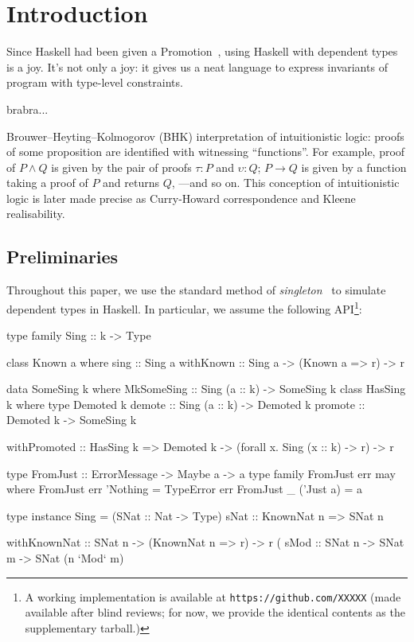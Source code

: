 \documentclass[demotion-paper.tex]{subfiles}
\begin{document}
\section{Introduction}
Since Haskell had been given a Promotion~\cite{Yorgey:2012}, using Haskell with dependent types is a joy.
It's not only a joy: it gives us a neat language to express invariants of program with type-level constraints.

brabra...

Brouwer--Heyting--Kolmogorov (BHK) interpretation of intuitionistic logic: proofs of some proposition are identified with witnessing ``functions''.
For example, proof of $P \land Q$ is given by the pair of proofs $\tau: P$ and $\upsilon: Q$; $P \to Q$ is given by a function taking a proof of $P$ and returns $Q$, ---and so on.
This conception of intuitionistic logic is later made precise as Curry-Howard correspondence and Kleene realisability.

\subsection{Preliminaries}
Throughout this paper, we use the standard method of \emph{singleton}~\cite{Eisenberg:2012} to simulate dependent types in Haskell.
In particular, we assume the following API\footnote{A working implementation is available at \texttt{https://github.com/XXXXX} (made available after blind reviews; for now, we provide the identical contents as the supplementary tarball.)}:

\begin{code}
type family Sing :: k -> Type

class Known a where
  sing :: Sing a
withKnown :: Sing a -> (Known a => r) -> r

data SomeSing k where
  MkSomeSing :: Sing (a :: k) -> SomeSing k
class HasSing k where
  type Demoted k 
  demote :: Sing (a :: k) -> Demoted k
  promote :: Demoted k -> SomeSing k

withPromoted :: HasSing k
  => Demoted k
  -> (forall x. Sing (x :: k) -> r) -> r

type FromJust :: ErrorMessage -> Maybe a -> a
type family FromJust err may where 
  FromJust err 'Nothing = TypeError err
  FromJust _ ('Just a)  = a

type instance Sing = (SNat :: Nat -> Type)
sNat :: KnownNat n => SNat n

withKnownNat :: SNat n -> (KnownNat n => r) -> r
(%
sMod :: SNat n -> SNat m -> SNat (n `Mod` m)
\end{code}
\end{document}

